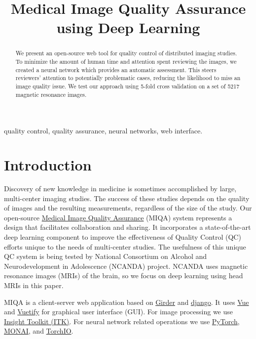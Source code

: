 \documentclass{midl} %
\title[Medical Image Quality Assurance using Deep Learning]{Medical Image Quality Assurance using Deep Learning}
\begin{document}
\maketitle

\begin{abstract}
We present an open-source web tool for quality control of distributed imaging studies.
To minimize the amount of human time and attention spent reviewing the images,
we created a neural network which provides an automatic assessment.
This steers reviewers' attention to potentially problematic cases,
reducing the likelihood to miss an image quality issue.
We test our approach using 5-fold cross validation on a set of 5217 magnetic resonance images.
\end{abstract}

\begin{keywords}
quality control, quality assurance, neural networks, web interface.
\end{keywords}

\section{Introduction}

Discovery of new knowledge in medicine is sometimes accomplished by large, multi-center imaging studies. The success of these studies depends on the quality of images and the resulting measurements, regardless of the size of the study.
Our open-source \href{https://github.com/OpenImaging/miqa}{Medical Image Quality Assurance} (MIQA) system represents a design that facilitates collaboration and sharing. It incorporates a state-of-the-art deep learning component to improve the effectiveness of Quality Control (QC) efforts unique to the needs of multi-center studies. The usefulness of this unique QC system is being tested by National Consortium on Alcohol and Neurodevelopment in Adolescence (NCANDA) project. NCANDA uses magnetic resonance images (MRIs) of the brain, so we focus on deep learning using head MRIs in this paper.

MIQA is a client-server web application based on \href{https://github.com/girder/girder}{Girder} and \href{https://www.django-rest-framework.org/}{django}. It uses \href{https://vuejs.org/}{Vue} and \href{https://vuetifyjs.com/}{Vuetify} for graphical user interface (GUI). For image processing we use \href{https://itk.org/}{Insight Toolkit (ITK)}. For neural network related operations we use \href{https://pytorch.org/}{PyTorch}, \href{https://monai.io/}{MONAI}, and \href{https://torchio.readthedocs.io/}{TorchIO}.
\end{document}
